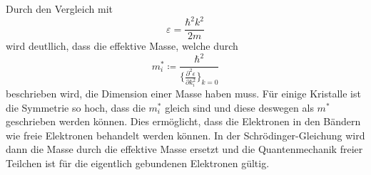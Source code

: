 Durch den Vergleich mit
\begin{equation*}
  \varepsilon = \frac{\hbar^2 k^2}{2 m}
\end{equation*}
wird deutllich, dass die effektive Masse, welche durch
\begin{equation*}
  m_i^* \coloneqq \frac{\hbar^2}{\Big\{\frac{\partial^2\epsilon}{\partial k_i^2}\Big\}_{k=0}}
\end{equation*}
beschrieben wird, die Dimension einer Masse haben muss. Für einige Kristalle ist die Symmetrie so hoch, dass die $m_i^*$ gleich sind und diese deswegen als $m^*$ geschrieben
werden können. \newline
Dies ermöglicht, dass die Elektronen in den Bändern wie freie Elektronen behandelt werden können. In der Schrödinger-Gleichung wird dann
die Masse durch die effektive Masse ersetzt und die Quantenmechanik freier Teilchen ist für die eigentlich
gebundenen Elektronen gültig.


